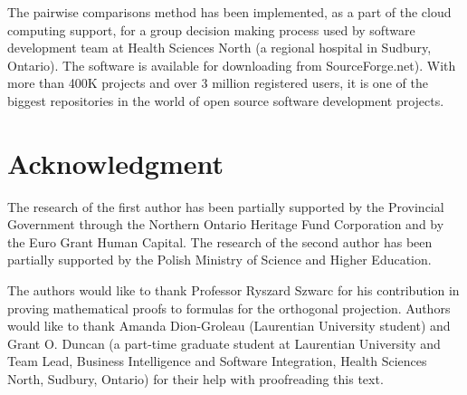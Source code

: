 \documentclass [12pt]{article}
\theoremstyle{definition}
\begin{document}
The pairwise comparisons method has been implemented, as a part of the cloud computing support, for a group decision making process used by software development team at Health Sciences North (a regional hospital in Sudbury, Ontario). The software is available for downloading from SourceForge.net). With more than 400K projects and over 3 million registered users, it is one of the biggest repositories in the world of open source software development projects.

\section*{Acknowledgment}
The research of the first author has been partially supported by the Provincial Government through the Northern Ontario Heritage Fund Corporation and by the Euro Grant Human Capital. The research of the second author has been partially supported by the Polish Ministry of Science and Higher Education. 

The authors would like to thank Professor Ryszard Szwarc for his contribution in proving mathematical proofs to formulas for the orthogonal projection. Authors would like to thank Amanda Dion-Groleau (Laurentian University student) and Grant O. Duncan (a part-time graduate student at Laurentian University and Team Lead, Business Intelligence and Software Integration, Health Sciences North, Sudbury, Ontario) for their help with proofreading this text.
\end{document}
